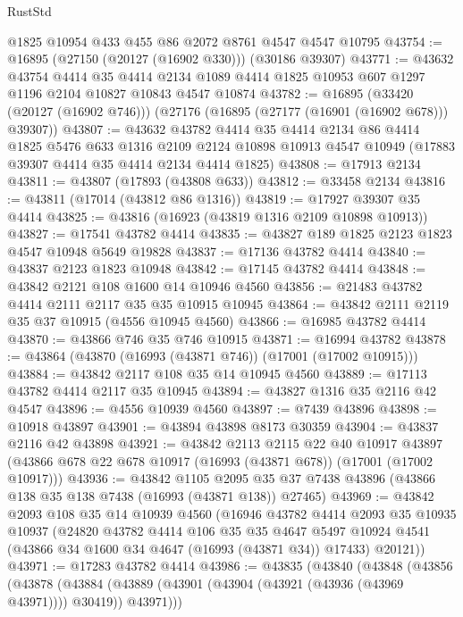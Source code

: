 \begin{lexlean}{RustStd}
\begin{coremodule}
{\begin{coremodule}
{{{{{{{{{{{{{{{{{{{{{{{{{{{{{{{{{{{{{{{{{{{{{{{{{{{{{{{    @1825
    @10954
    @433
    @455
    @86
    @2072
    @8761
    @4547
    @4547
    @10795
@43754 := @16895 (@27150 (@20127 (@16902 @330))) (@30186 @39307)
@43771 := @43632
    @43754
    @4414
    @35
    @4414
    @2134
    @1089
    @4414
    @1825
    @10953
    @607
    @1297
    @1196
    @2104
    @10827
    @10843
    @4547
    @10874
@43782 := @16895
    (@33420 (@20127 (@16902 @746)))
    (@27176 (@16895 (@27177 (@16901 (@16902 @678))) @39307))
@43807 := @43632
    @43782
    @4414
    @35
    @4414
    @2134
    @86
    @4414
    @1825
    @5476
    @633
    @1316
    @2109
    @2124
    @10898
    @10913
    @4547
    @10949
    (@17883 @39307 @4414 @35 @4414 @2134 @4414 @1825)
@43808 := @17913 @2134
@43811 := @43807 (@17893 (@43808 @633))
@43812 := @33458 @2134
@43816 := @43811 (@17014 (@43812 @86 @1316))
@43819 := @17927 @39307 @35 @4414
@43825 := @43816 (@16923 (@43819 @1316 @2109 @10898 @10913))
@43827 := @17541 @43782 @4414
@43835 := @43827 @189 @1825 @2123 @1823 @4547 @10948 @5649 @19828
@43837 := @17136 @43782 @4414
@43840 := @43837 @2123 @1823 @10948
@43842 := @17145 @43782 @4414
@43848 := @43842 @2121 @108 @1600 @14 @10946 @4560
@43856 := @21483 @43782 @4414 @2111 @2117 @35 @35 @10915 @10945
@43864 := @43842 @2111 @2119 @35 @37 @10915 (@4556 @10945 @4560)
@43866 := @16985 @43782 @4414
@43870 := @43866 @746 @35 @746 @10915
@43871 := @16994 @43782
@43878 := @43864 (@43870 (@16993 (@43871 @746)) (@17001 (@17002 @10915)))
@43884 := @43842 @2117 @108 @35 @14 @10945 @4560
@43889 := @17113 @43782 @4414 @2117 @35 @10945
@43894 := @43827 @1316 @35 @2116 @42 @4547
@43896 := @4556 @10939 @4560
@43897 := @7439 @43896
@43898 := @10918 @43897
@43901 := @43894 @43898 @8173 @30359
@43904 := @43837 @2116 @42 @43898
@43921 := @43842
    @2113
    @2115
    @22
    @40
    @10917
    @43897
    (@43866 @678 @22 @678 @10917 (@16993 (@43871 @678)) (@17001 (@17002 @10917)))
@43936 := @43842
    @1105
    @2095
    @35
    @37
    @7438
    @43896
    (@43866 @138 @35 @138 @7438 (@16993 (@43871 @138)) @27465)
@43969 := @43842
    @2093
    @108
    @35
    @14
    @10939
    @4560
    (@16946
      @43782
      @4414
      @2093
      @35
      @10935
      @10937
      (@24820
        @43782
        @4414
        @106
        @35
        @35
        @4647
        @5497
        @10924
        @4541
        (@43866 @34 @1600 @34 @4647 (@16993 (@43871 @34)) @17433)
        @20121))
@43971 := @17283 @43782 @4414
@43986 := @43835
    (@43840
      (@43848
        (@43856
          (@43878
            (@43884 (@43889 (@43901 (@43904 (@43921 (@43936 (@43969 @43971)))) @30419)) @43971)))
}}}}}}}}}}}}}}}}}}}}}}}}}}}}}}}}}}}}}}}}}}}}}}}}}}}}}}}
\end{coremodule}}
\end{coremodule}
\end{lexlean}
